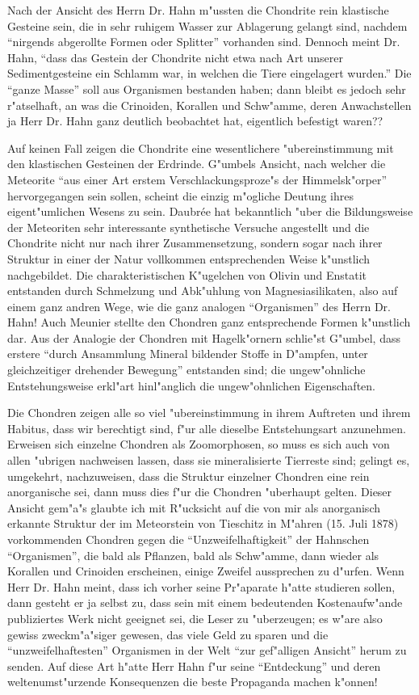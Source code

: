 \documentclass[a4paper, 12pt, oneside]{article}
\begin{document}
Nach der Ansicht des Herrn Dr. Hahn m"ussten die Chondrite rein klastische Gesteine sein, die in sehr ruhigem Wasser zur Ablagerung gelangt sind, nachdem "`nirgends abgerollte Formen oder Splitter"' vorhanden sind. Dennoch meint Dr. Hahn, "`dass das Gestein der Chondrite nicht etwa nach Art unserer Sedimentgesteine ein Schlamm war, in welchen die Tiere eingelagert wurden."' Die "`ganze Masse"' soll aus Organismen bestanden haben; dann bleibt es jedoch sehr r"atselhaft, an was die Crinoiden, Korallen und Schw"amme, deren Anwachstellen ja Herr Dr. Hahn ganz deutlich beobachtet hat, eigentlich befestigt waren??

Auf keinen Fall zeigen die Chondrite eine wesentlichere "ubereinstimmung mit den klastischen Gesteinen der Erdrinde. G"umbels Ansicht, nach welcher die Meteorite "`aus einer Art erstem Verschlackungsproze"s der Himmelsk"orper"' hervorgegangen sein sollen, scheint die einzig m"ogliche Deutung ihres eigent"umlichen Wesens zu sein. Daubrée hat bekanntlich "uber die Bildungsweise der Meteoriten sehr interessante synthetische Versuche angestellt und die Chondrite nicht nur nach ihrer Zusammensetzung, sondern sogar nach ihrer Struktur in einer der Natur vollkommen entsprechenden Weise k"unstlich nachgebildet. Die charakteristischen K"ugelchen von Olivin und Enstatit entstanden durch Schmelzung und Abk"uhlung von Magnesiasilikaten, also auf einem ganz andren Wege, wie die ganz analogen "`Organismen"' des Herrn Dr. Hahn! Auch Meunier stellte den Chondren ganz entsprechende Formen k"unstlich dar. Aus der Analogie der Chondren mit Hagelk"ornern schlie"st G"umbel, dass erstere "`durch Ansammlung Mineral bildender Stoffe in D"ampfen, unter gleichzeitiger drehender Bewegung"' entstanden sind; die ungew"ohnliche Entstehungsweise erkl"art hinl"anglich die ungew"ohnlichen Eigenschaften.

Die Chondren zeigen alle so viel "ubereinstimmung in ihrem Auftreten und ihrem Habitus, dass wir berechtigt sind, f"ur alle dieselbe Entstehungsart anzunehmen. Erweisen sich einzelne Chondren als Zoomorphosen, so muss es sich auch von allen "ubrigen nachweisen lassen, dass sie mineralisierte Tierreste sind; gelingt es, umgekehrt, nachzuweisen, dass die Struktur einzelner Chondren eine rein anorganische sei, dann muss dies f"ur die Chondren "uberhaupt gelten. Dieser Ansicht gem"a"s glaubte ich mit R"ucksicht auf die von mir als anorganisch erkannte Struktur der im Meteorstein von Tieschitz in M"ahren (15. Juli 1878) vorkommenden Chondren gegen die "`Unzweifelhaftigkeit"' der Hahnschen "`Organismen"', die bald als Pflanzen, bald als Schw"amme, dann wieder als Korallen und Crinoiden erscheinen, einige Zweifel aussprechen zu d"urfen. Wenn Herr Dr. Hahn meint, dass ich vorher seine Pr"aparate h"atte studieren sollen, dann gesteht er ja selbst zu, dass sein mit einem bedeutenden Kostenaufw"ande publiziertes Werk nicht geeignet sei, die Leser zu "uberzeugen; es w"are also gewiss zweckm"a"siger gewesen, das viele Geld zu sparen und die "`unzweifelhaftesten"' Organismen in der Welt "`zur gef"alligen Ansicht"' herum zu senden. Auf diese Art h"atte Herr Hahn f"ur seine "`Entdeckung"' und deren weltenumst"urzende Konsequenzen die beste Propaganda machen k"onnen!
\end{document}
